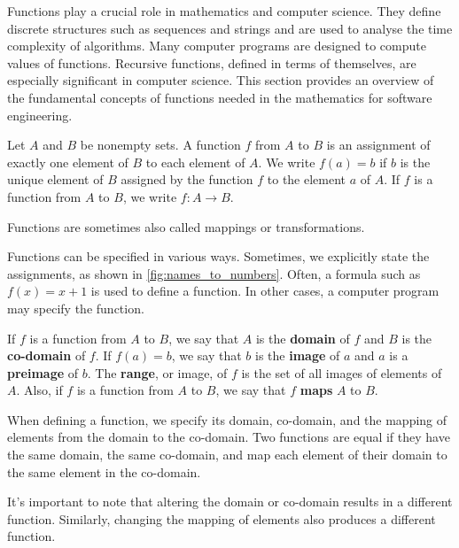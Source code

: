 Functions play a crucial role in mathematics and computer science. They define discrete structures such as sequences and strings and are used to analyse the time complexity of algorithms. Many computer programs are designed to compute values of functions. Recursive functions, defined in terms of themselves, are especially significant in computer science. This section provides an overview of the fundamental concepts of functions needed in the mathematics for software engineering.

\begin{definition}
Let $A$ and $B$ be nonempty sets. A function $f$ from $A$ to $B$ is an assignment of exactly one element of $B$ to each element of $A$. We write $f(a)=b$ if $b$ is the unique element of $B$ assigned by the function $f$ to the element $a$ of $A$. If $f$ is a function from $A$ to $B$, we write $f: A \rightarrow B$.
\end{definition}

\begin{remark}
    Functions are sometimes also called mappings or transformations.
\end{remark}

Functions can be specified in various ways. Sometimes, we explicitly state the assignments, as shown in \autoref{fig:names_to_numbers}. Often, a formula such as \(f(x) = x + 1\) is used to define a function. In other cases, a computer program may specify the function.

\begin{definition}
If $f$ is a function from $A$ to $B$, we say that $A$ is the \textbf{domain} of $f$ and $B$ is the \textbf{co-domain} of $f$. If $f(a)=b$, we say that $b$ is the \textbf{image} of $a$ and $a$ is a \textbf{preimage} of $b$. The \textbf{range}, or image, of $f$ is the set of all images of elements of $A$. Also, if $f$ is a function from $A$ to $B$, we say that $f$ \textbf{maps} $A$ to $B$.    
\end{definition}

When defining a function, we specify its domain, co-domain, and the mapping of elements from the domain to the co-domain. Two functions are equal if they have the same domain, the same co-domain, and map each element of their domain to the same element in the co-domain. 

It's important to note that altering the domain or co-domain results in a different function. Similarly, changing the mapping of elements also produces a different function.


